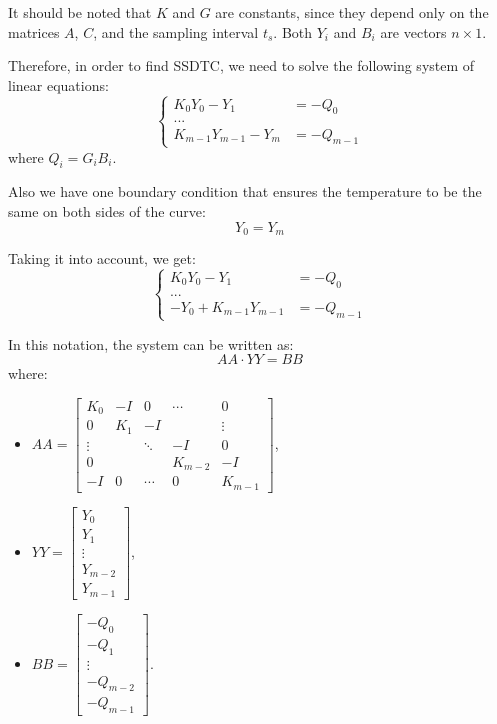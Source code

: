 It should be noted that $K$ and $G$ are constants, since they depend only on the matrices $A$, $C$, and the sampling interval $t_s$.  Both $Y_i$ and $B_i$ are vectors $n \times 1$.

Therefore, in order to find SSDTC, we need to solve the following system of linear equations:
\[
  \begin{cases}
    K_0 Y_0 - Y_1 & = -Q_0 \\
    ... \\
    K_{m-1} Y_{m-1} - Y_{m} & = -Q_{m-1}
  \end{cases}
\]
where $Q_i = G_i B_i$.

Also we have one boundary condition that ensures the temperature to be the same on both sides of the curve:
\begin{equation} \label{eq:boundary-condition}
  Y_0 = Y_m
\end{equation}

Taking it into account, we get:
\[
  \begin{cases}
    K_0 Y_0 - Y_1 & =-Q_0 \\
    ... \\
    -Y_0 + K_{m-1} Y_{m-1} & = -Q_{m-1}
  \end{cases}
\]

In this notation, the system can be written as:
\begin{equation} \label{eq:system}
  AA \cdot YY = BB
\end{equation}
where:
\begin{itemize}
  \item
    $AA = \left[
      \begin{array}{ccccc}
        K_0 & -I & 0 & \cdots & 0 \\
        0 & K_1 & -I &  & \vdots \\
        \vdots &  & \ddots & -I & 0 \\
        0 &  &  & K_{m-2} & -I \\
        -I & 0 & \cdots & 0 & K_{m-1}
      \end{array}
    \right]$,

  \item
    $YY = \left[
      \begin{array}{c}
        Y_0 \\
        Y_1 \\
        \vdots \\
        Y_{m-2} \\
        Y_{m-1}
      \end{array}
    \right]$,

  \item $BB = \left[
    \begin{array}{c}
      -Q_0 \\
      -Q_1 \\
      \vdots \\
      -Q_{m-2} \\
      -Q_{m-1}
    \end{array}
  \right]$.
\end{itemize}

